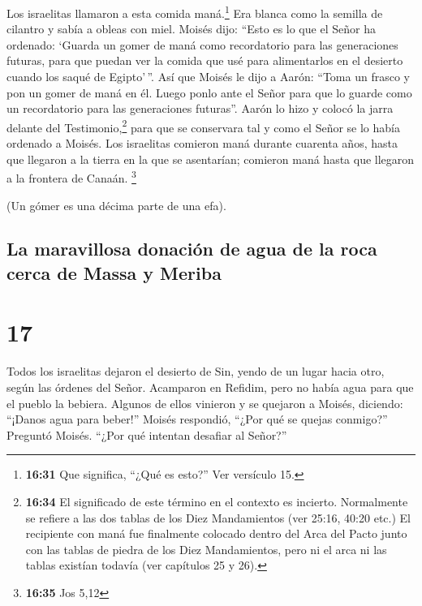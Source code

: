  Los israelitas llamaron a esta comida maná.\footnote{\textbf{16:31}
  Que significa, ``¿Qué es esto?'' Ver versículo 15.} Era blanca como la
semilla de cilantro y sabía a obleas con miel.  Moisés
dijo: ``Esto es lo que el Señor ha ordenado: `Guarda un gomer de maná
como recordatorio para las generaciones futuras, para que puedan ver la
comida que usé para alimentarlos en el desierto cuando los saqué de
Egipto'\,''.  Así que Moisés le dijo a Aarón: ``Toma un
frasco y pon un gomer de maná en él. Luego ponlo ante el Señor para que
lo guarde como un recordatorio para las generaciones futuras''.
 Aarón lo hizo y colocó la jarra delante del
Testimonio,\footnote{\textbf{16:34} El significado de este término en el
  contexto es incierto. Normalmente se refiere a las dos tablas de los
  Diez Mandamientos (ver 25:16, 40:20 etc.) El recipiente con maná fue
  finalmente colocado dentro del Arca del Pacto junto con las tablas de
  piedra de los Diez Mandamientos, pero ni el arca ni las tablas
  existían todavía (ver capítulos 25 y 26).} para que se conservara tal
y como el Señor se lo había ordenado a Moisés.  Los
israelitas comieron maná durante cuarenta años, hasta que llegaron a la
tierra en la que se asentarían; comieron maná hasta que llegaron a la
frontera de Canaán. \footnote{\textbf{16:35} Jos 5,12}

 (Un gómer es una décima parte de una efa).

\hypertarget{la-maravillosa-donaciuxf3n-de-agua-de-la-roca-cerca-de-massa-y-meriba}{%
\subsection{La maravillosa donación de agua de la roca cerca de Massa y
Meriba}\label{la-maravillosa-donaciuxf3n-de-agua-de-la-roca-cerca-de-massa-y-meriba}}

\hypertarget{section-16}{%
\section{17}\label{section-16}}

 Todos los israelitas dejaron el desierto de Sin, yendo de
un lugar hacia otro, según las órdenes del Señor. Acamparon en Refidim,
pero no había agua para que el pueblo la bebiera.  Algunos
de ellos vinieron y se quejaron a Moisés, diciendo: ``¡Danos agua para
beber!'' Moisés respondió, ``¿Por qué se quejas conmigo?'' Preguntó
Moisés. ``¿Por qué intentan desafiar al Señor?''

